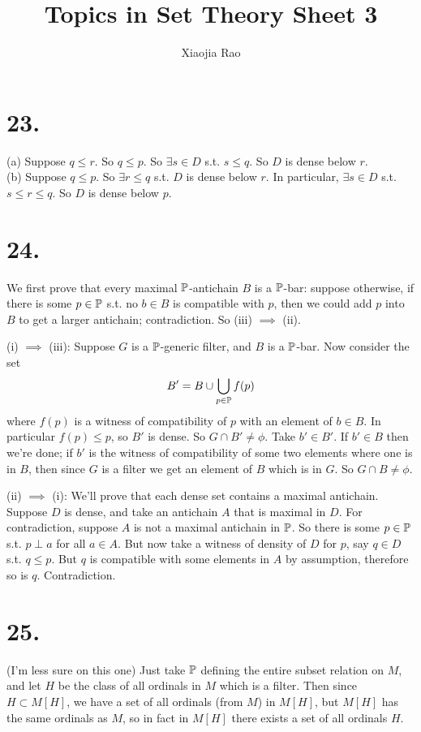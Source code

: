 \documentclass[a4paper]{article}
\begin{document}
\title{Topics in Set Theory Sheet 3}

\author{Xiaojia Rao}

\maketitle

\newpage

\section*{23.}
(a) Suppose $q \leq r$. So $q \leq p$. So $\exists s \in D$ s.t. $s \leq q$. So $D$ is dense below $r$.\\
(b) Suppose $q \leq p$. So $\exists r \leq q$ s.t. $D$ is dense below $r$. In particular, $\exists s \in D$ s.t. $s \leq r \leq q$. So $D$ is dense below $p$.

\section*{24.}

We first prove that every maximal $\P$-antichain $B$ is a $\P$-bar: suppose otherwise, if there is some $p \in \P$ s.t. no $b \in B$ is compatible with $p$, then we could add $p$ into $B$ to get a larger antichain; contradiction. So (iii) $\implies$ (ii).

(i) $\implies$ (iii): Suppose $G$ is a $\P$-generic filter, and $B$ is a $\P$-bar. Now consider the set 
\[
B' = B \cup \bigcup_{p \in \P} f(p)
\]
where $f(p)$ is a witness of compatibility of $p$ with an element of $b \in B$. In particular $f(p) \leq p$, so $B'$ is dense. So $G \cap B' \neq \phi$. Take $b' \in B'$. If $b' \in B$ then we're done; if $b'$ is the witness of compatibility of some two elements where one is in $B$, then since $G$ is a filter we get an element of $B$ which is in $G$. So $G \cap B \neq \phi$.

(ii) $\implies$ (i): We'll prove that each dense set contains a maximal antichain. Suppose $D$ is dense, and take an antichain $A$ that is maximal in $D$. For contradiction, suppose $A$ is not a maximal antichain in $\P$. So there is some $p \in \P$ s.t. $p \perp a$ for all $a \in A$. But now take a witness of density of $D$ for $p$, say $q \in D$ s.t. $q \leq p$. But $q$ is compatible with some elements in $A$ by assumption, therefore so is $q$. Contradiction.

\section*{25.}
(I'm less sure on this one) Just take $\P$ defining the entire subset relation on $M$, and let $H$ be the class of all ordinals in $M$ which is a filter. Then since $H \subset M[H]$, we have a set of all ordinals (from $M$) in $M[H]$, but $M[H]$ has the same ordinals as $M$, so in fact in $M[H]$ there exists a set of all ordinals $H$.
\end{document}
